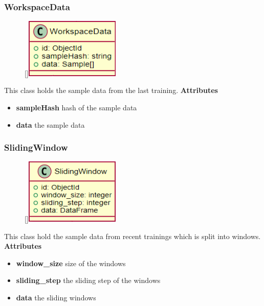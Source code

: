 \subsubsection{WorkspaceData}
\label{WorkspaceData}
\begin{figure}
    \raisebox{0pt}[\dimexpr{}\baselineskip\relax]{\includegraphics[width=4.5cm]{classes/model-management/14.png}}
\end{figure} 
\par
This class holds the sample data from the last training.
\newline
\newline
\textbf{Attributes}
\begin{itemize}
    \item \textbf{sampleHash} hash of the sample data
    \item \textbf{data} the sample data
\end{itemize}

\subsubsection{SlidingWindow}
\label{SlidingWindow}
\begin{figure}
    \raisebox{0pt}[\dimexpr{}\baselineskip\relax]{\includegraphics[width=4.5cm]{classes/model-management/15.png}}
\end{figure} 
\par
This class hold the sample data from recent trainings which is split into windows.
\newline
\newline
\textbf{Attributes}
\begin{itemize}
    \item \textbf{window\_size} size of the windows
    \item \textbf{sliding\_step} the sliding step of the windows
    \item \textbf{data} the sliding windows
\end{itemize}

